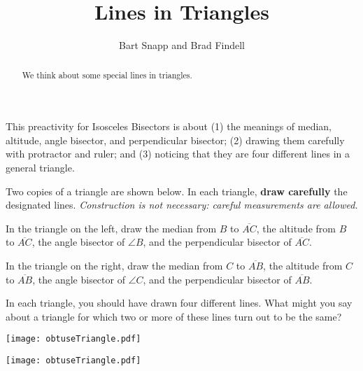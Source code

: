 \documentclass[nooutcomes]{ximera}
\title{Lines in Triangles}
\author{Bart Snapp and Brad Findell}
\begin{document}
\begin{abstract}
  We think about some special lines in triangles. 
\end{abstract}
\maketitle

\begin{teachingnote}
This preactivity for Isosceles Bisectors is about (1) the meanings of median, altitude, angle bisector, and perpendicular bisector; (2) drawing them carefully with protractor and ruler; and (3) noticing that they are four different lines in a general triangle. 
\end{teachingnote}

Two copies of a triangle are shown below.   In each triangle, \textbf{draw carefully} the designated lines.  \emph{Construction is not necessary:  careful measurements are allowed.}

\begin{problem}
In the triangle on the left, draw the median from $B$ to $\overline{AC}$, the altitude from $B$ to $\overline{AC}$, the angle bisector of $\angle B$, and the perpendicular bisector of $\overline{AC}$.  

\end{problem}

\begin{problem}
In the triangle on the right, draw the median from $C$ to $\overline{AB}$, the altitude from $C$ to $\overline{AB}$, the angle bisector of $\angle C$, and the perpendicular bisector of $\overline{AB}$. 

%
\end{problem}

\begin{problem}
In each triangle, you should have drawn four different lines.  What might you say about a triangle for which two or more of these lines turn out to be the same?  
\end{problem}

\texttt{[image: obtuseTriangle.pdf]}

\texttt{[image: obtuseTriangle.pdf]}
\end{document}
